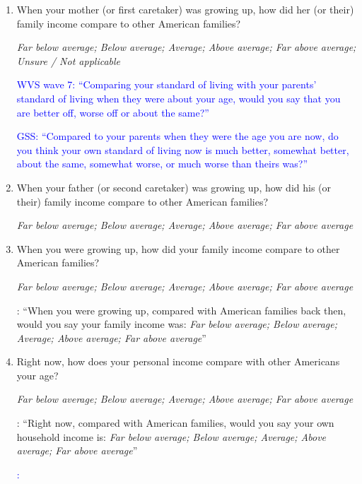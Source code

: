 \documentclass[11pt, headsepline]{article}
\newcommand{\blue}[1]{\textcolor{blue}{#1}}
\newcommand{\green}[1]{\textcolor{sharpgreen}{#1}}
\begin{document}
\begin{enumerate}[resume]

    \item When your mother (or first caretaker) was growing up, how did her (or their) family income compare to other American families?

    \textit{Far below average; Below average; Average; Above average; Far above average; Unsure / Not applicable}

    \blue{WVS wave 7: ``Comparing your standard of living with your parents’ standard of living when they were about your age, would you say that you are better off, worse off or about the same?''}

    \blue{GSS: ``Compared to your parents when they were the age you are now, do you think your own standard of living now is much better, somewhat better, about the same, somewhat worse, or much worse than theirs was?''}

    \item When your father (or second caretaker) was growing up, how did his (or their) family income compare to other American families?

    \textit{Far below average; Below average; Average; Above average; Far above average}

    \item When you were growing up, how did your family income compare to other American families?

    \textit{Far below average; Below average; Average; Above average; Far above average}

    \green{\cite{alesina2018intergenerational}: ``When you were growing up, compared with American families back then, would you say your family income was: \textit{Far below average; Below average; Average; Above average; Far above average}''}

    \item Right now, how does your personal income compare with other Americans your age?

    \textit{Far below average; Below average; Average; Above average; Far above average}

    \green{\cite{alesina2018intergenerational}: ``Right now, compared with American families, would you say your own household income is: \textit{Far below average; Below average; Average; Above average; Far above average}''}

    \blue{\cite{hvidberg2023social}:}
    
\end{enumerate}
\end{document}
